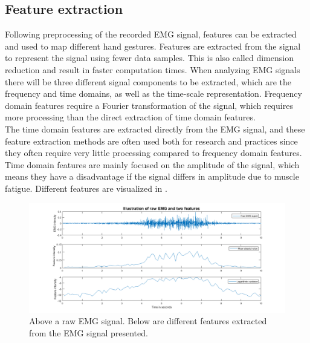 \subsection{Feature extraction}



Following preprocessing of the recorded EMG signal, features can be extracted and used to map different hand gestures. Features are extracted from the signal to represent the signal using fewer data samples. This is also called dimension reduction and result in faster computation times. When analyzing EMG signals there will be three different signal components to be extracted, which are the frequency and time domains, as well as the time-scale representation. Frequency domain features require a Fourier transformation of the signal, which requires more processing than the direct extraction of time domain features. \cite{phiny2012} \\
The time domain features are extracted directly from the EMG signal, and these feature extraction methods are often used both for research and practices since they often require very little processing compared to frequency domain features. Time domain features are mainly focused on the amplitude of the signal, which means they have a disadvantage if the signal differs in amplitude due to muscle fatigue. \cite{phiny2012} Different features are visualized in . 

\begin{figure}[H]                    
	\includegraphics[width=1\textwidth]{figures/background/EMG_features}  %
	\caption{Above a raw EMG signal. Below are different features extracted from the EMG signal presented.}
	\label{fig:EMGfeatures}
\end{figure}


